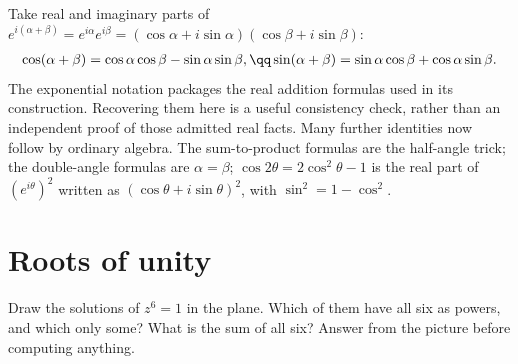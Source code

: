 \begin{examplex}
Take real and imaginary parts of $e^{i(\alpha+\beta)}=e^{i\alpha}e^{i\beta}=(\cos\alpha+i\sin\alpha)(\cos\beta+i\sin\beta)$:
\[
\begin{gathered}\cos(\alpha+\beta)=\cos\alpha\cos\beta-\sin\alpha\sin\beta,\qq\sin(\alpha+\beta)=\sin\alpha\cos\beta+\cos\alpha\sin\beta.\end{gathered}
\]
The exponential notation packages the real addition formulas used in its construction. Recovering them here is a useful consistency check, rather than an independent proof of those admitted real facts. Many further identities now follow by ordinary algebra. The sum-to-product formulas are the half-angle trick; the double-angle formulas are $\alpha=\beta$; $\cos2\theta=2\cos^2\theta-1$
is the real part of $(e^{i\theta})^2$ written as $(\cos\theta+i\sin\theta)^2$, with $\sin^2=1-\cos^2$.
\end{examplex}

\section{Roots of unity}

\begin{think}
Draw the solutions of $z^6=1$ in the plane. Which of them have all six as powers, and which only some? What is the sum of all six? Answer from the picture before computing anything.
\end{think}

